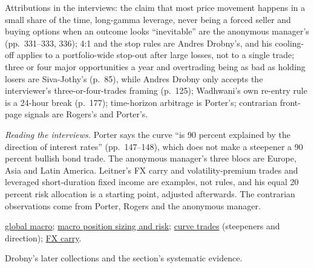 \begin{qfmethod}
 Attributions in the interviews: the claim that most price movement happens in a small share of the time, long-gamma leverage, never being a forced seller and buying options when an outcome looks ``inevitable'' are the anonymous manager's (pp.~331--333, 336); 4:1 and the stop rules are Andres Drobny's, and his cooling-off applies to a portfolio-wide stop-out after large losses, not to a single trade; three or four major opportunities a year and overtrading being as bad as holding losers are Siva-Jothy's (p.~85), while Andres Drobny only accepts the interviewer's three-or-four-trades framing (p.~125); Wadhwani's own re-entry rule is a 24-hour break (p.~177); time-horizon arbitrage is Porter's; contrarian front-page signals are Rogers's and Porter's.

 \emph{Reading the interviews.} Porter says the curve ``is 90 percent explained by the direction of interest rates'' (pp.~147--148), which does not make a steepener a 90 percent bullish bond trade. The anonymous manager's three blocs are Europe, Asia and Latin America. Leitner's FX carry and volatility-premium trades and leveraged short-duration fixed income are examples, not rules, and his equal 20 percent risk allocation is a starting point, adjusted afterwards. The contrarian observations come from Porter, Rogers and the anonymous manager.

 \hyperref[def:global-macro-strategy]{global macro}; \hyperref[meth:macro-position-sizing-risk]{macro position sizing and risk}; \hyperref[meth:curve-trades-carry-rolldown]{curve trades} (steepeners and direction); \hyperref[mod:fx-carry-trade]{FX carry}.

 Drobny's later collections and the section's systematic evidence.

\end{qfmethod}
